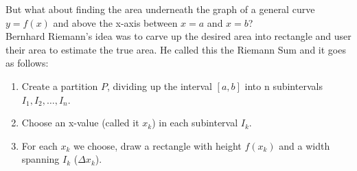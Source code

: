 But what about finding the area underneath the graph of a general curve $ y = f(x) $ and above the x-axis between $  x = a $ and $ x = b $? \\

Bernhard Riemann's idea was to carve up the desired area into rectangle and user their area to estimate the true area. He called this the Riemann Sum and it goes as follows: \\

\begin{enumerate}
    \item
          Create a partition $ P $, dividing up the interval $ [a, b] $ into n subintervals $ I_1, I_2, \dots, I_n $. \\

    \item
          Choose an x-value (called it $ x_k $) in each subinterval $ I_k $. \\

    \item
          For each $ x_k $ we choose, draw a rectangle with height $ f(x_k) $ and a width spanning $ I_k $ ($ \Delta x_k $). \\
\end{enumerate}

\begin{figure}[H]
    \centering
\end{figure}

